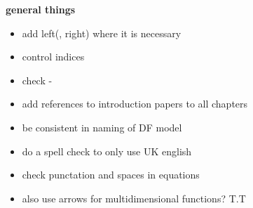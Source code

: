 \textbf{general things}
\begin{itemize}
    \item add left(, right) where it is necessary 
    \item control indices 
    \item check - 
    \item add references to introduction papers to all chapters
    \item be consistent in naming of DF model 
    \item do a spell check to only use UK english
    \item check punctation and spaces in equations
    \item also use arrows for multidimensional functions? T.T
\end{itemize}